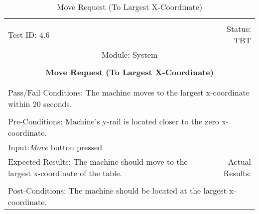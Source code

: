 \documentclass[titlepage]{article}
\begin{document}
\begin{center}%
\begin{table}
\begin{tabular}{|l r|}\hline&\\[-2mm]
	Test ID: 4.6	&Status: TBT\\[-3mm]
	\multicolumn{2}{|c|}{Module: System}\\&\\
	\multicolumn{2}{|c|}{\textbf{\large{Move Request (To Largest X-Coordinate)}}}\\&\\\hline&\\[-3mm]
	\multicolumn{2}{|p{\textwidth}|}{Pass/Fail Conditions: The machine moves to the largest x-coordinate within 20 seconds.}\\[1mm]\hline&\\[-3mm]
	\multicolumn{2}{|p{\textwidth}|}{Pre-Conditions: Machine's y-rail is located closer to the zero x-coordinate.}\\[4mm]
	\multicolumn{2}{|p{\textwidth}|}{Input:\newline\textit{Move} button pressed}\\[2mm]\hline
	\multicolumn{1}{|p{0.49\textwidth}}{Expected Results: The machine should move to the largest x-coordinate of the table.}	&\multicolumn{1}{|p{0.45\textwidth}|}{Actual Results: }\\\hline&\\[-3mm]
	\multicolumn{2}{|p{\textwidth}|}{Post-Conditions: The machine should be located at the largest x-coordinate.}\\\hline
\end{tabular}
\caption{Move Request (To Largest X-Coordinate)}
\end{table}
\end{center}
\end{document}
